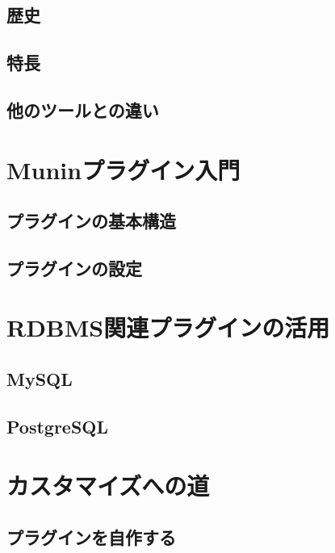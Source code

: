 \subsection{歴史}

\subsection{特長}

\subsection{他のツールとの違い}

\section{Muninプラグイン入門}

\subsection{プラグインの基本構造}

\subsection{プラグインの設定}

\section{RDBMS関連プラグインの活用}

\subsection{MySQL}

\subsection{PostgreSQL}

\section{カスタマイズへの道}

\subsection{プラグインを自作する}

